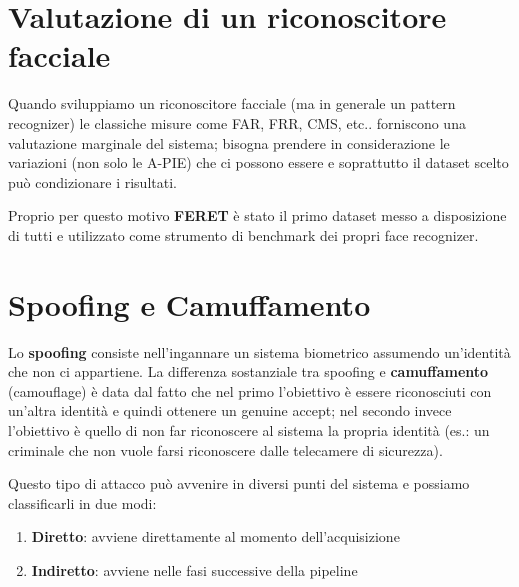 \documentclass{article}
\begin{document}
\section{Valutazione di un riconoscitore facciale}
Quando sviluppiamo un riconoscitore facciale (ma in generale un pattern recognizer) le classiche misure come FAR, FRR, CMS, etc.. forniscono una valutazione marginale del sistema; bisogna prendere in considerazione le variazioni (non solo le A-PIE) che ci possono essere e soprattutto il dataset scelto può condizionare i risultati.

Proprio per questo motivo \textbf{FERET} è stato il primo dataset messo a disposizione di tutti e utilizzato come strumento di benchmark dei propri face recognizer.


\section{Spoofing e Camuffamento}
Lo \textbf{spoofing} consiste nell'ingannare un sistema biometrico assumendo un'identità che non ci appartiene.
La differenza sostanziale tra spoofing e \textbf{camuffamento} (camouflage) è data dal fatto che nel primo l'obiettivo è essere riconosciuti con un'altra identità e quindi ottenere un genuine accept; nel secondo invece l'obiettivo è quello di non far riconoscere al sistema la propria identità (es.: un criminale che non vuole farsi riconoscere dalle telecamere di sicurezza).

\bigskip
Questo tipo di attacco può avvenire in diversi punti del sistema e possiamo classificarli in due modi:
\begin{enumerate}
    \item \textbf{Diretto}: avviene direttamente al momento dell'acquisizione
    \item \textbf{Indiretto}: avviene nelle fasi successive della pipeline
\end{enumerate}
\end{document}
